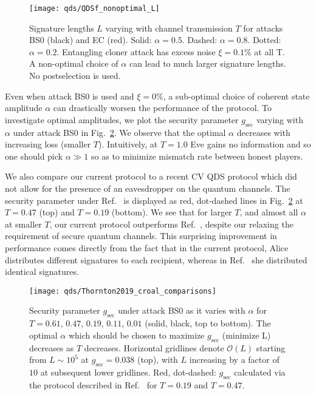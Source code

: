\begin{figure}[htp]
\captionsetup{width=0.8\linewidth}
\centering
\texttt{[image: qds/QDSf\_nonoptimal\_L]}
\caption{\label{fig:qds_nonoptimal_L} Signature lengths $L$ varying with channel transmission $T$ for attacks BS$0$ (black) and EC (red). Solid: $\alpha=0.5$. Dashed: $\alpha=0.8$. Dotted: $\alpha=0.2$. Entangling cloner attack has excess noise $\xi = 0.1\%$ at all T. A non-optimal choice of $\alpha$ can lead to much larger signature lengths. No postselection is used.}
\end{figure}


Even when attack BS$0$ is used and $\xi=0\%$, a sub-optimal choice of coherent state amplitude $\alpha$ can drastically worsen the performance of the protocol. To investigate optimal amplitudes, we plot the security parameter $g_{\text{sec}}$ varying with $\alpha$ under attack BS$0$ in Fig.~\ref{fig:qds_gsec_croal}. We observe that the optimal $\alpha$ decreases with increasing loss (smaller $T$). Intuitively, at $T=1.0$ Eve gains no information and so one should pick $\alpha \gg 1$ so as to minimize mismatch rate between honest players. 

We also compare our current protocol to a recent CV QDS protocol \cite{Croal2016} which did not allow for the presence of an eavesdropper on the quantum channels. The security parameter under Ref.~\cite{Croal2016} is displayed as red, dot-dashed lines in Fig.~\ref{fig:qds_gsec_croal} at $T=0.47$ (top) and $T=0.19$ (bottom). We see that for larger $T$, and almost all $\alpha$ at smaller $T$, our current protocol outperforms Ref.~\cite{Croal2016}, despite our relaxing the requirement of secure quantum channels. This surprising improvement in performance comes directly from the fact that in the current protocol, Alice distributes different signatures to each recipient, whereas in Ref.~\cite{Croal2016} she distributed identical signatures.

\begin{figure}[htp]
\captionsetup{width=0.8\linewidth}
\centering
\texttt{[image: qds/Thornton2019\_croal\_comparisons]}
\caption{\label{fig:qds_gsec_croal} Security parameter $g_{\text{sec}}$ under attack BS$0$ as it varies with $\alpha$ for $T = 0.61$, $0.47$, $0.19$, $0.11$, $0.01$ (solid, black, top to bottom). The optimal $\alpha$ which should be chosen to maximize $g_{\text{sec}}$ (minimize L) decreases as $T$ decreases. Horizontal gridlines denote $\mathcal{O}\left(L\right)$ starting from $L \sim 10^5$ at $g_{\text{sec}} = 0.038$ (top), with $L$ increasing by a factor of $10$ at subsequent lower gridlines. Red, dot-dashed: $g_{\text{sec}}$ calculated via the protocol described in Ref.~\cite{Croal2016} for $T=0.19$ and $T=0.47$.}
\end{figure}

